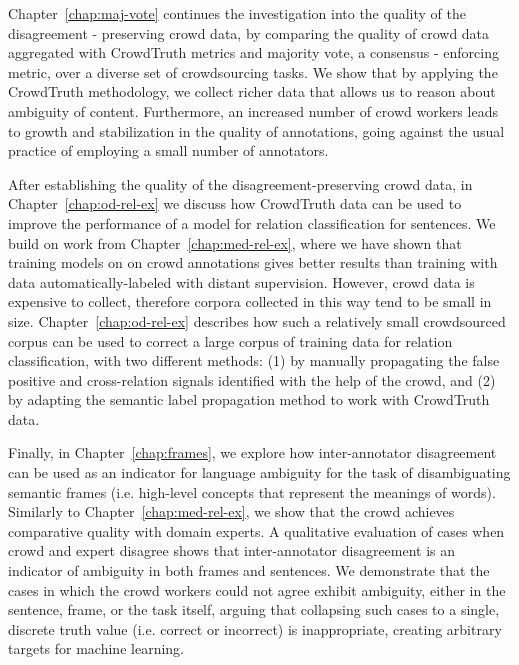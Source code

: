 Chapter~\ref{chap:maj-vote} continues the investigation into the quality of the disagreement - preserving crowd data, by comparing the quality of crowd data aggregated with CrowdTruth metrics and majority vote, a consensus - enforcing metric, over a diverse set of crowdsourcing tasks. We show that by applying the CrowdTruth methodology, we collect richer data that allows us to reason about ambiguity of content. Furthermore, an increased number of crowd workers leads to growth and stabilization in the quality of annotations, going against the usual practice of employing a small number of annotators.

After establishing the quality of the disagreement-preserving crowd data, in Chapter~\ref{chap:od-rel-ex} we discuss how CrowdTruth data can be used to improve the performance of a model for relation classification for sentences. We build on work from Chapter~\ref{chap:med-rel-ex}, where we have shown that training models on on crowd annotations gives better results than training with data automatically-labeled with distant supervision. However, crowd data is expensive to collect, therefore corpora collected in this way tend to be small in size. Chapter~\ref{chap:od-rel-ex} describes how such a relatively small crowdsourced corpus can be used to correct a large corpus of training data for relation classification, with two different methods: (1) by manually propagating the false positive and cross-relation signals identified with the help of the crowd, and (2) by adapting the semantic label propagation method to work with CrowdTruth data.

Finally, in Chapter~\ref{chap:frames}, we explore how inter-annotator disagreement can be used as an indicator for language ambiguity for the task of disambiguating semantic frames (i.e. high-level concepts that represent the meanings of words). Similarly to Chapter~\ref{chap:med-rel-ex}, we show that the crowd achieves comparative quality with domain experts. A qualitative evaluation of cases when crowd and expert disagree shows that inter-annotator disagreement is an indicator of ambiguity in both frames and sentences. We demonstrate that the cases in which the crowd workers could not agree exhibit ambiguity, either in the sentence, frame, or the task itself, arguing that collapsing such cases to a single, discrete truth value (i.e. correct or incorrect) is inappropriate, creating arbitrary targets for machine learning.
